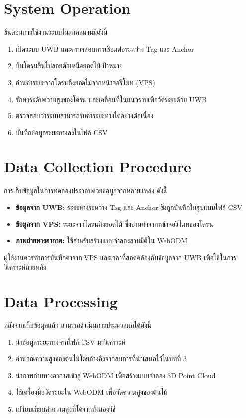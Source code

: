 \section{System Operation}
ขั้นตอนการใช้งานระบบในภาคสนามมีดังนี้

\begin{enumerate}
    \item เปิดระบบ UWB และตรวจสอบการเชื่อมต่อระหว่าง Tag และ Anchor
    \item บินโดรนขึ้นไปลอยตัวเหนือยอดไม้เป้าหมาย
    \item อ่านค่าระยะจากโดรนถึงยอดไม้จากหน้าจอรีโมท (VPS)
    \item รักษาระดับความสูงของโดรน และเคลื่อนที่ในแนวราบเพื่อวัดระยะด้วย UWB
    \item ตรวจสอบว่าระบบสามารถรับค่าระยะทางได้อย่างต่อเนื่อง
    \item บันทึกข้อมูลระยะทางลงในไฟล์ CSV
\end{enumerate}

\section{Data Collection Procedure}
การเก็บข้อมูลในการทดลองประกอบด้วยข้อมูลจากหลายแหล่ง ดังนี้

\begin{itemize}
    \item \textbf{ข้อมูลจาก UWB:} ระยะทางระหว่าง Tag และ Anchor ซึ่งถูกบันทึกในรูปแบบไฟล์ CSV
    \item \textbf{ข้อมูลจาก VPS:} ระยะจากโดรนถึงยอดไม้ ซึ่งอ่านค่าจากหน้าจอรีโมทของโดรน
    \item \textbf{ภาพถ่ายทางอากาศ:} ใช้สำหรับสร้างแบบจำลองสามมิติใน WebODM
\end{itemize}

ผู้ใช้งานควรทำการบันทึกค่าจาก VPS และเวลาที่สอดคล้องกับข้อมูลจาก UWB เพื่อใช้ในการวิเคราะห์ภายหลัง

\section{Data Processing}
หลังจากเก็บข้อมูลแล้ว สามารถดำเนินการประมวลผลได้ดังนี้

\begin{enumerate}
    \item นำข้อมูลระยะทางจากไฟล์ CSV มาวิเคราะห์
    \item คำนวณความสูงของต้นไม้โดยอ้างอิงจากสมการที่นำเสนอไว้ในบทที่ 3
    \item นำภาพถ่ายทางอากาศเข้าสู่ WebODM เพื่อสร้างแบบจำลอง 3D Point Cloud
    \item ใช้เครื่องมือวัดระยะใน WebODM เพื่อวัดความสูงของต้นไม้
    \item เปรียบเทียบค่าความสูงที่ได้จากทั้งสองวิธี
\end{enumerate}

